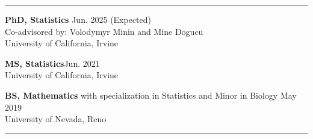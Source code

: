 \documentclass{article}
\begin{document}
	\vspace{-2mm}
	\rule{\linewidth}{1pt}
	
	
	
	\begin{description}
		\vspace{-2mm}
		\item[Education]\hspace*{.1in}
		
		\textbf{PhD, Statistics} \hfill{Jun. 2025 (Expected)} \\
		Co-advisored by: Volodymyr Minin and Mine Dogucu\\	
		University of California, Irvine
		\vspace*{1mm}
		
		\textbf{MS, Statistics}\hfill{Jun. 2021}\\
		University of California, Irvine
		\vspace*{1mm}
		
		\textbf{BS, Mathematics} with specialization in Statistics and Minor in Biology \hfill{May 2019} \\
		University of Nevada, Reno
		
	\end{description}
	\vspace{-2mm}
	\rule{\linewidth}{1pt}
	
	
	
\end{document}

